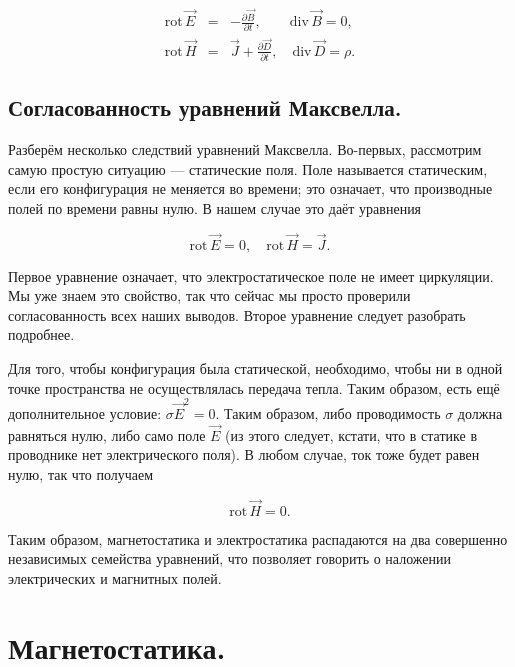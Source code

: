 \documentclass[11pt,a4paper]{article}
\numberwithin{equation}{section}
\newcommand{\nn}{\nonumber}
\newcommand{\pt}{\partial}
\newcommand{\rot}{\mathrm{rot}\,}
\renewcommand{\div}{\mathrm{div}\,}
\begin{document}
\begin{eqnarray}
  \label{eq:maxwell_equations}
  \nn
  \rot \vec{E} &=& - \frac{\pt \vec{B}}{\pt t}, \qquad \div \vec{B} = 0,\\
  \rot \vec{H} &=& \vec{J} + \frac{\pt \vec{D}}{\pt t}, \quad \div
  \vec{D} = \rho.
\end{eqnarray}

\subsection{Согласованность уравнений Максвелла.}
\label{sec:cons_maxwell}

Разберём несколько следствий уравнений Максвелла. Во-первых,
рассмотрим самую простую ситуацию --- статические поля. Поле
называется статическим, если его конфигурация не меняется во времени;
это означает, что производные полей по времени равны нулю. В нашем
случае это даёт уравнения

\begin{equation}
  \label{eq:statics_maxwell_1}
  \rot \vec{E} = 0, \quad \rot \vec{H} = \vec{J}.
\end{equation}

Первое уравнение означает, что электростатическое поле не имеет
циркуляции. Мы уже знаем это свойство, так что сейчас мы просто
проверили согласованность всех наших выводов. Второе уравнение следует
разобрать подробнее. 

Для того, чтобы конфигурация была статической, необходимо, чтобы ни в
одной точке пространства не осуществлялась передача тепла. Таким
образом, есть ещё дополнительное условие: $\sigma \vec{E}^2 =
0$. Таким образом, либо проводимость $\sigma$ должна равняться нулю,
либо само поле $\vec{E}$ (из этого следует, кстати, что в статике в
проводнике нет электрического поля). В любом случае, ток тоже будет
равен нулю, так что получаем

\begin{equation}
  \label{eq:statics_maxwell_2}
  \rot \vec{H} = 0.
\end{equation}

Таким образом, магнетостатика и электростатика распадаются на два
совершенно независимых семейства уравнений, что позволяет говорить о
наложении электрических и магнитных полей. 

\section{Магнетостатика.}
\label{sec:magnetostatics}
\end{document}
